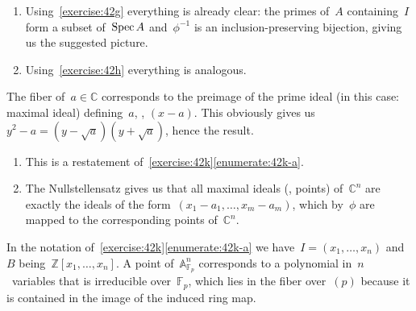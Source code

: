 \begin{exercise}
  \label{exercise:42k}
  \begin{enumerate}
    \item\label{enumerate:42k-a} Using~\autoref{exercise:42g} everything is already clear: the primes of~$A$ containing~$I$ form a subset of~$\operatorname{Spec} A$ and~$\phi^{-1}$ is an inclusion-preserving bijection, giving us the suggested picture.

    \item Using~\autoref{exercise:42h} everything is analogous.
  \end{enumerate}
\end{exercise}

\begin{exercise}
  The fiber of~$a\in\mathbb{C}$ corresponds to the preimage of the prime ideal (in this case: maximal ideal) defining~$a$, \ie, $(x-a)$. This obviously gives us~$y^2-a=(y-\sqrt{a})(y+\sqrt{a})$, hence the result.
\end{exercise}

\begin{exercise} %
  \begin{enumerate}
    \item This is a restatement of~\autoref{exercise:42k}\ref{enumerate:42k-a}.

    \item The Nullstellensatz gives us that all maximal ideals (\ie, points) of~$\mathbb{C}^n$ are exactly the ideals of the form~$(x_1-a_1,\ldots,x_m-a_m)$, which by~$\phi$ are mapped to the corresponding points of~$\mathbb{C}^n$.
  \end{enumerate}
\end{exercise}

\begin{exercise} %
  In the notation of~\autoref{exercise:42k}\ref{enumerate:42k-a} we have~$I=(x_1,\ldots,x_n)$ and~$B$ being~$\mathbb{Z}[x_1,\ldots,x_n]$. A point of~$\mathbb{A}_{\mathbb{F}_p}^n$ corresponds to a polynomial in~$n$~variables that is irreducible over~$\mathbb{F}_p$, which lies in the fiber over~$(p)$ because it is contained in the image of the induced ring map.
\end{exercise}

